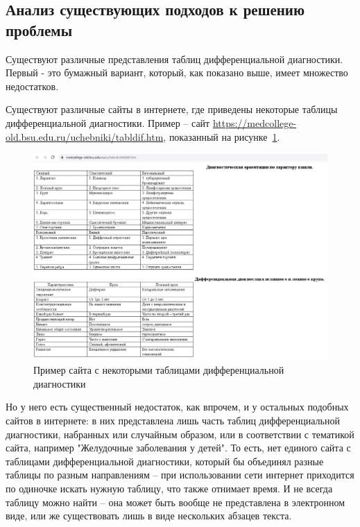 \subsection{Анализ существующих подходов к решению проблемы}

Существуют различные представления таблиц дифференциальной диагностики. Первый - это бумажный вариант, который, как показано выше, имеет множество недостатков.

Существуют различные сайты в интернете, где приведены некоторые таблицы дифференциальной диагностики. Пример --  сайт \url{https://medcollege-old.bsu.edu.ru/uchebniki/tabldif.htm}, показанный на рисунке~\ref{fig:tab2}\cite{medcollege}.

\begin{figure}
  \includegraphics[scale=0.5]{src/extab1.png}
  \caption{Пример сайта с некоторыми таблицами дифференциальной диагностики}
  \label{fig:tab2}
\end{figure}

Но у него есть существенный недостаток, как впрочем, и у остальных подобных сайтов в интернете: в них представлена лишь часть таблиц дифференциальной диагностики, набранных или случайным образом, или в соответствии с тематикой сайта, например "Желудочные заболевания у детей". То есть, нет единого сайта с таблицами дифференциальной диагностики, который бы объединял разные таблицы по разным направлениям -- при использовании сети интернет приходится по одиночке искать нужную таблицу, что также отнимает время. И не всегда таблицу можно найти -- она может быть вообще не представлена в электронном виде, или же существовать лишь в виде нескольких абзацев текста.

